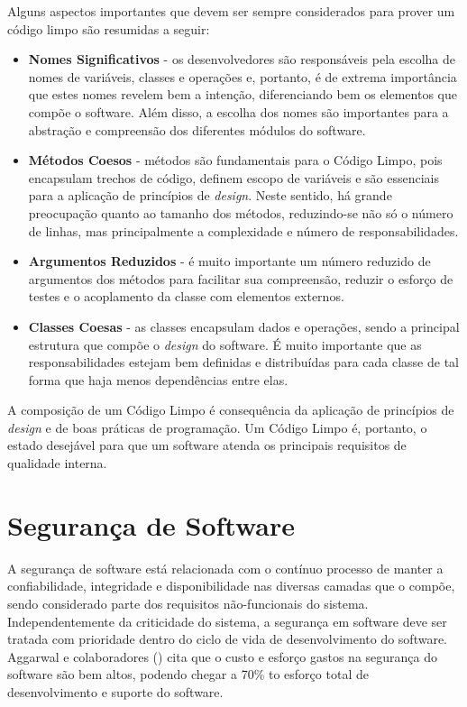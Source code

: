 %

Alguns aspectos importantes que devem ser sempre considerados para prover um código limpo são resumidas a seguir:

\begin{itemize}
\item \textbf{Nomes Significativos} - os desenvolvedores são responsáveis pela escolha de nomes de variáveis, classes e operações e, portanto, é de extrema importância que estes nomes revelem bem a intenção, diferenciando bem os elementos que compõe o software. Além disso, a escolha dos nomes são importantes para a abstração e compreensão dos diferentes módulos do software.
\item \textbf{Métodos Coesos} - métodos são fundamentais para o Código Limpo, pois encapsulam trechos de código, definem escopo de variáveis e são essenciais para a aplicação de princípios de \emph{design}. Neste sentido, há grande preocupação quanto ao tamanho dos métodos, reduzindo-se não só o número de linhas, mas principalmente a complexidade e número de responsabilidades.
\item \textbf{Argumentos Reduzidos} - é muito importante um número reduzido de argumentos dos métodos para facilitar sua compreensão, reduzir o esforço de testes e o acoplamento da classe com elementos externos.
\item \textbf{Classes Coesas} - as classes encapsulam dados e operações, sendo a principal estrutura que compõe o \emph{design} do software. É muito importante que as responsabilidades estejam bem definidas e distribuídas para cada classe de tal forma que haja menos dependências entre elas.
\end{itemize}

%

A composição de um Código Limpo é consequência da aplicação de princípios de \emph{design} e de boas práticas de programação. Um Código Limpo é, portanto, o estado desejável para que um software atenda os principais requisitos de qualidade interna. 



\section{Segurança de Software}
\label{sec-metrics-security}

A segurança de software está relacionada com o contínuo processo de manter a confiabilidade, integridade e disponibilidade nas diversas camadas que o compõe, sendo considerado parte dos requisitos não-funcionais do sistema. Independentemente da criticidade do sistema, a segurança em software deve ser tratada com prioridade dentro do ciclo de vida de desenvolvimento do software. Aggarwal e colaboradores (\citeyear{aggarwal2002}) cita que o custo e esforço gastos na segurança do software são bem altos, podendo chegar a 70\% to esforço total de desenvolvimento e suporte do software.

